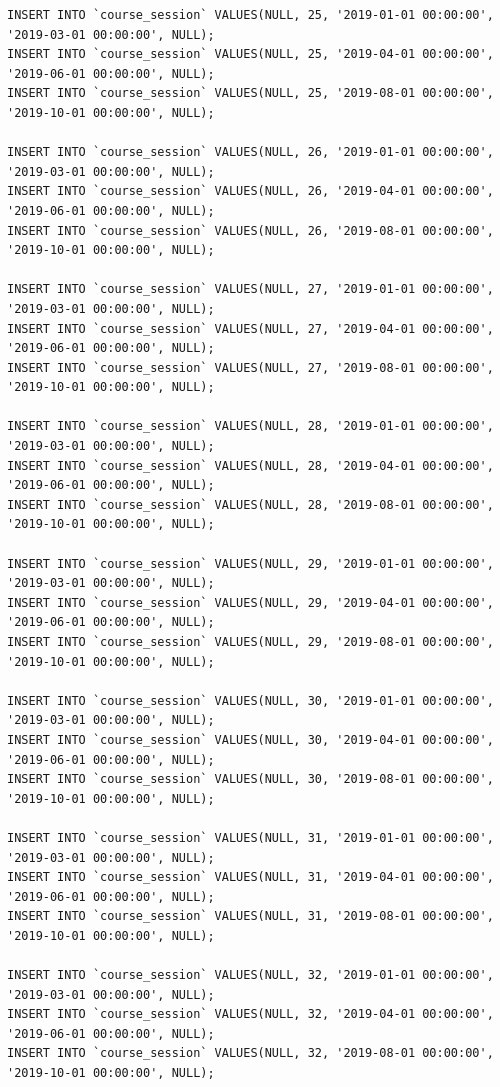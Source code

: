 \documentclass[12pt,a4paper,titlepage]{article}
\begin{document}
\begin{lstlisting}
INSERT INTO `course_session` VALUES(NULL, 25, '2019-01-01 00:00:00', '2019-03-01 00:00:00', NULL);
INSERT INTO `course_session` VALUES(NULL, 25, '2019-04-01 00:00:00', '2019-06-01 00:00:00', NULL);
INSERT INTO `course_session` VALUES(NULL, 25, '2019-08-01 00:00:00', '2019-10-01 00:00:00', NULL);

INSERT INTO `course_session` VALUES(NULL, 26, '2019-01-01 00:00:00', '2019-03-01 00:00:00', NULL);
INSERT INTO `course_session` VALUES(NULL, 26, '2019-04-01 00:00:00', '2019-06-01 00:00:00', NULL);
INSERT INTO `course_session` VALUES(NULL, 26, '2019-08-01 00:00:00', '2019-10-01 00:00:00', NULL);

INSERT INTO `course_session` VALUES(NULL, 27, '2019-01-01 00:00:00', '2019-03-01 00:00:00', NULL);
INSERT INTO `course_session` VALUES(NULL, 27, '2019-04-01 00:00:00', '2019-06-01 00:00:00', NULL);
INSERT INTO `course_session` VALUES(NULL, 27, '2019-08-01 00:00:00', '2019-10-01 00:00:00', NULL);

INSERT INTO `course_session` VALUES(NULL, 28, '2019-01-01 00:00:00', '2019-03-01 00:00:00', NULL);
INSERT INTO `course_session` VALUES(NULL, 28, '2019-04-01 00:00:00', '2019-06-01 00:00:00', NULL);
INSERT INTO `course_session` VALUES(NULL, 28, '2019-08-01 00:00:00', '2019-10-01 00:00:00', NULL);

INSERT INTO `course_session` VALUES(NULL, 29, '2019-01-01 00:00:00', '2019-03-01 00:00:00', NULL);
INSERT INTO `course_session` VALUES(NULL, 29, '2019-04-01 00:00:00', '2019-06-01 00:00:00', NULL);
INSERT INTO `course_session` VALUES(NULL, 29, '2019-08-01 00:00:00', '2019-10-01 00:00:00', NULL);

INSERT INTO `course_session` VALUES(NULL, 30, '2019-01-01 00:00:00', '2019-03-01 00:00:00', NULL);
INSERT INTO `course_session` VALUES(NULL, 30, '2019-04-01 00:00:00', '2019-06-01 00:00:00', NULL);
INSERT INTO `course_session` VALUES(NULL, 30, '2019-08-01 00:00:00', '2019-10-01 00:00:00', NULL);

INSERT INTO `course_session` VALUES(NULL, 31, '2019-01-01 00:00:00', '2019-03-01 00:00:00', NULL);
INSERT INTO `course_session` VALUES(NULL, 31, '2019-04-01 00:00:00', '2019-06-01 00:00:00', NULL);
INSERT INTO `course_session` VALUES(NULL, 31, '2019-08-01 00:00:00', '2019-10-01 00:00:00', NULL);

INSERT INTO `course_session` VALUES(NULL, 32, '2019-01-01 00:00:00', '2019-03-01 00:00:00', NULL);
INSERT INTO `course_session` VALUES(NULL, 32, '2019-04-01 00:00:00', '2019-06-01 00:00:00', NULL);
INSERT INTO `course_session` VALUES(NULL, 32, '2019-08-01 00:00:00', '2019-10-01 00:00:00', NULL);


\end{lstlisting}
\end{document}
